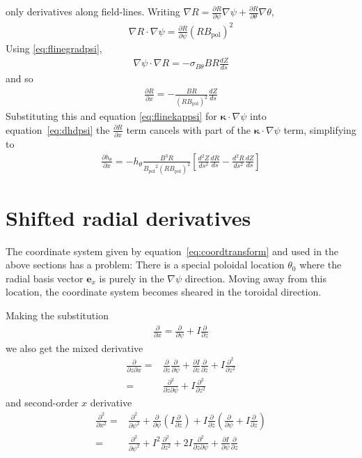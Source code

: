 \documentclass[12pt]{article}
\newcommand{\sbt}{\ensuremath{\sigma_{B\theta}}}
\newcommand{\deriv}[2]{\ensuremath{\frac{\partial #1}{\partial #2}}}
\newcommand{\hthe}{\ensuremath{h_\theta}}
\newcommand{\Bp}{\ensuremath{B_{\text{pol}}}}
\newcommand{\ve}[1]{\ensuremath{\boldsymbol{#1}}}
\newcommand{\kvec}{\ve{\kappa}}
\newcommand{\rbp}{\ensuremath{R\Bp}}
\newcommand{\rbpsq}{\ensuremath{\left(\rbp\right)^2}}
\begin{document}
only derivatives along
field-lines.
Writing $\nabla R = \deriv{R}{\psi}\nabla\psi + \deriv{R}{\theta}\nabla\theta$,
%
\begin{align*}
\nabla R \cdot \nabla\psi = \deriv{R}{\psi}\rbpsq
\end{align*}
%
Using \ref{eq:flinegradpsi},
%
\begin{align*}
\nabla\psi \cdot \nabla R = -\sbt B R\frac{dZ}{ds}
\end{align*}
%
and so
%
\begin{align*}
\deriv{R}{x} = -\frac{BR}{\rbpsq}\frac{dZ}{ds}
\end{align*}
%
Substituting this and equation \ref{eq:flinekappsi} for $\kvec\cdot\nabla\psi$
into equation~\ref{eq:dhdpsi}
the $\deriv{R}{x}$ term cancels with part of the $\kvec\cdot\nabla\psi$ term,
simplifying to
%
\begin{align*}
\deriv{\hthe}{x} =
-\hthe\frac{B^3R}{\Bp^2\rbpsq}\left[\frac{d^2Z}{ds^2}\frac{dR}{ds} -
\frac{d^2R}{ds^2}\frac{dZ}{ds}\right]
\end{align*}



\section{Shifted radial derivatives}
\label{sec:shiftcoords}
The coordinate system given by equation~\ref{eq:coordtransform} and used in the
above sections has a problem: There is a special poloidal location $\theta_0$
where the radial basis vector $\ve{e}_x$ is purely in the $\nabla\psi$
direction.
Moving away from this location, the coordinate system becomes sheared in 
the toroidal direction.

Making the substitution
%
\begin{align*}
\deriv{}{x} = \deriv{}{\psi} + I\deriv{}{z}
\end{align*}
%
we also get the mixed derivative
%
\begin{align*}
\frac{\partial}{\partial z\partial x} =& \deriv{}{z}\deriv{}{\psi} + 
\deriv{I}{z}\deriv{}{z} + I\frac{\partial^2}{\partial z^2} \nonumber \\
=& \frac{\partial^2}{\partial z\partial \psi} + I\frac{\partial^2}{\partial 
z^2}
\end{align*}
%
and second-order $x$ derivative
%
\begin{align*}
\frac{\partial^2}{\partial x^2} =& \frac{\partial^2}{\partial \psi^2} + 
\deriv{}{\psi}\left(I\deriv{}{z}\right) + I\deriv{}{z}\left(\deriv{}{\psi} + 
I\deriv{}{z}\right) \nonumber \\
=& \frac{\partial^2}{\partial \psi^2} + I^2\frac{\partial^2}{\partial z^2} + 
2I\frac{\partial^2}{\partial z\partial \psi} + \deriv{I}{\psi}\deriv{}{z}
\end{align*}
\end{document}
